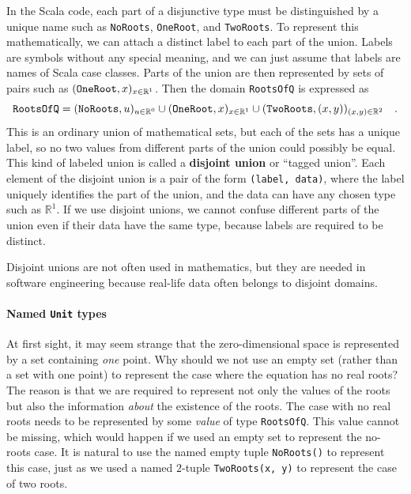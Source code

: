 In the Scala code, each part of a disjunctive type must be distinguished
by a unique name such as \lstinline!NoRoots!, \lstinline!OneRoot!,
and \lstinline!TwoRoots!. To represent this mathematically, we can
attach a distinct label to each part of the union. Labels are symbols
without any special meaning, and we can just assume that labels are
names of Scala case classes. Parts of the union are then represented
by sets of pairs such as $(\text{\texttt{OneRoot}},x)_{x\in\mathbb{R}^{1}}$.
Then the domain \lstinline!RootsOfQ! is expressed as
\[
\text{\texttt{RootsOfQ}}=(\text{\texttt{NoRoots}},u)_{u\in\mathbb{R}^{0}}\cup(\text{\texttt{OneRoot}},x)_{x\in\mathbb{R}^{1}}\cup(\text{\texttt{TwoRoots}},\left(x,y\right))_{\left(x,y\right)\in\mathbb{R}^{2}}\quad.
\]
This is an ordinary union of mathematical sets, but each of the sets
has a unique label, so no two values from different parts of the union
could possibly be equal. This kind of labeled union is called a \textbf{disjoint
union} or \textsf{``}tagged union\textsf{''}. Each element of the disjoint union is
a pair of the form \lstinline!(label, data)!, where the label uniquely
identifies the part of the union, and the data can have any chosen
type such as $\mathbb{R}^{1}$. If we use disjoint unions, we cannot
confuse different parts of the union even if their data have the same
type, because labels are required to be distinct.

Disjoint unions are not often used in mathematics, but they are needed
in software engineering because real-life data often belongs to disjoint
domains.

\paragraph{Named \texttt{Unit} types}

At first sight, it may seem strange that the zero-dimensional space
is represented by a set containing \emph{one} point. Why should we
not use an empty set (rather than a set with one point) to represent
the case where the equation has no real roots? The reason is that
we are required to represent not only the values of the roots but
also the information \emph{about} the existence of the roots. The
case with no real roots needs to be represented by some \emph{value}
of type \lstinline!RootsOfQ!. This value cannot be missing, which
would happen if we used an empty set to represent the no-roots case.
It is natural to use the named empty tuple \lstinline!NoRoots()!
to represent this case, just as we used a named $2$-tuple \lstinline!TwoRoots(x, y)!
to represent the case of two roots.

